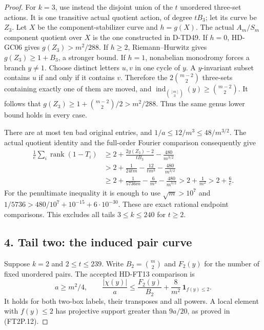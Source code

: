 \begin{proof}
For $k=3$, use instead the disjoint union of the $t$ unordered
three-set actions.  It is one transitive actual quotient
action, of degree $tB_3$; let its curve be $Z_3$.
Let $X$ be the component-stabilizer curve and $h=g(X)$.
The actual $A_m/S_m$ component quotient over $X$ is the one
constructed in D-TD49.  If $h=0$, HD-GC06 gives
$g(Z_3)>m^2/288$.  If $h\ge2$, Riemann--Hurwitz gives
$g(Z_3)\ge1+B_3$, a stronger bound.
If $h=1$, nonabelian monodromy forces a branch $y\ne1$.
Choose distinct letters $u,v$ in one cycle of $y$.
A $y$-invariant subset contains $u$ if and only if it
contains $v$.  Therefore the $2\binom{m-2}{2}$ three-sets
containing exactly one of them are moved, and
$\operatorname{ind}_{\binom{[m]}3}(y)\ge\binom{m-2}{2}$.
It follows that $g(Z_3)\ge1+\binom{m-2}{2}/2>m^2/288$.
Thus the same genus lower bound holds in every case.

There are at most ten bad original entries, and
$1/a\le12/m^3\le48/m^{3/2}$.  The actual quotient identity
and the full-order Fourier comparison consequently give
\[
 \begin{split}
 \frac1e\sum_i\operatorname{rank}(1-T_i)
 &\ge2+\frac{2g(Z_3)-2}{tB_3}-\frac{480}{m^{3/2}}\\
 &>2+\frac1{24tm}-\frac{12}{tm^3}-\frac{480}{m^{3/2}}\\
 &\ge2+\frac1{5736m}-\frac6{m^3}-\frac{480}{m^{3/2}}
 >2+\frac1{m^2}>2+\frac6e .
 \end{split}
 \tag{NMT.20}
\]
For the penultimate inequality it is enough to use
$\sqrt m>10^7$ and
$1/5736>480/10^7+10^{-15}+6\cdot10^{-30}$.
These are exact rational endpoint comparisons.
This excludes all tails $3\le k\le240$ for $t\ge2$.

\subsection*{4. Tail two: the induced pair curve}

Suppose $k=2$ and $2\le t\le239$.  Write
$B_2=\binom m2$ and $F_2(y)$ for the number of fixed unordered
pairs.  The accepted HD-FT13 comparison is
\[
 a\ge m^2/4,\qquad
 \frac{|\chi(y)|}{a}\le\frac{F_2(y)}{B_2}
                  +\frac8{m^2}\,\mathbf1_{f(y)\le2}.
 \tag{NMT.21}
\]
It holds for both two-box labels, their transposes and all
powers.  A local element with $f(y)\le2$ has projective
support greater than $9a/20$, as proved in (FT2P.12).


\end{proof}
